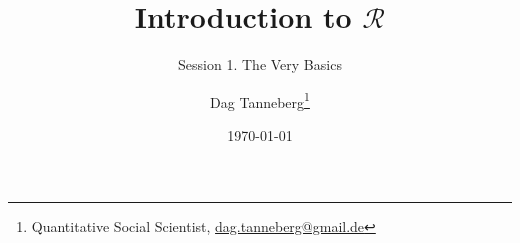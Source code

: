 \usepackage[utf8]{inputenc}
\usepackage{hyperref}
\usepackage{graphicx}
\usepackage{booktabs}
\usepackage{multirow}

\title{Introduction to $\mathcal{R}$}
\subtitle{Session 1. The Very Basics}
\author{Dag Tanneberg\thanks{%
  Quantitative Social Scientist, %
  \href{mailto:dag.tanneberg@gmail.de}%
    {dag.tanneberg@gmail.de}
  }
}
\date{\today}
\hypersetup{colorlinks, urlcolor = red, linkcolor = }
